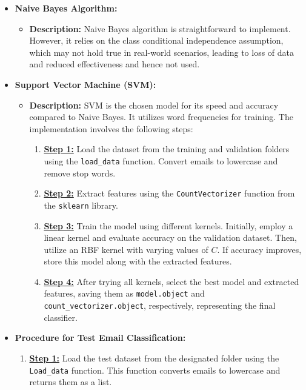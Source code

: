 \documentclass[12pt, a4paper]{article}
\begin{document}
\begin{itemize}
    \item \large \textbf{Naive Bayes Algorithm:}
    \begin{itemize}
        \item \textbf{Description:} Naive Bayes algorithm is straightforward to implement. However, it relies on the class conditional independence assumption, which may not hold true in real-world scenarios, leading to loss of data and reduced effectiveness and hence not used.
    \end{itemize}
    
    \item \large \textbf{Support Vector Machine (SVM):}
    \begin{itemize}
        \item \textbf{Description:} SVM is the chosen model for its speed and accuracy compared to Naive Bayes. It utilizes word frequencies for training. The implementation involves the following steps:
        \begin{enumerate}
            \item \textbf{\underline{Step 1:}} Load the dataset from the training and validation folders using the \texttt{load\_data} function. Convert emails to lowercase and remove stop words.
            
            \hfuzz=15pt \item \textbf{\underline{Step 2:}} Extract features using the \texttt{CountVectorizer} function from the \texttt{sklearn} library.
            
            \item \textbf{\underline{Step 3:}} Train the model using different kernels. Initially, employ a linear kernel and evaluate accuracy on the validation dataset. Then, utilize an RBF kernel with varying values of \( C \). If accuracy improves, store this model along with the extracted features.
            
            \hfuzz=150pt \item \textbf{\underline{Step 4:}} After trying all kernels, select the best model and extracted features, saving them as \texttt{model.object} and \texttt{count\_vectorizer.object}, respectively, representing the final classifier.
        \end{enumerate}
    \end{itemize}
    \item \large \textbf{Procedure for Test Email Classification:}
    \begin{enumerate}
        \hfuzz=19pt \item \textbf{\underline{Step 1:}} Load the test dataset from the designated folder using the \texttt{Load\_data} function. This function converts emails to lowercase and returns them as a list.
        

\end{enumerate}
\end{itemize}
\end{document}
